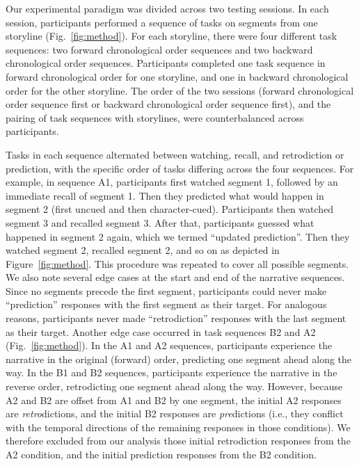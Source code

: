 \documentclass[10pt]{article}
\begin{document}
Our experimental paradigm was divided across two testing sessions. In each
session, participants performed a sequence of tasks on segments from one
storyline (Fig.~\ref{fig:method}). For each storyline, there were four
different task sequences: two forward chronological order sequences and two
backward chronological order sequences. Participants completed one task
sequence in forward chronological order for one storyline, and one in backward
chronological order for the other storyline. The order of the two sessions
(forward chronological order sequence first or backward chronological order
sequence first), and the pairing of task sequences with storylines, were
counterbalanced across participants.

Tasks in each sequence alternated between watching, recall, and retrodiction or
prediction, with the specific order of tasks differing across the four
sequences. For example, in sequence A1, participants first watched segment 1,
followed by an immediate recall of segment 1. Then they predicted what would
happen in segment 2 (first uncued and then character-cued). Participants then
watched segment 3 and recalled segment 3. After that, participants guessed what
happened in segment 2 again, which we termed ``updated prediction''. Then they
watched segment 2, recalled segment 2, and so on as depicted in
Figure~\ref{fig:method}. This procedure was repeated to cover all possible
segments. We also note several edge cases at the start and end of the narrative
sequences. Since no segments precede the first segment, participants could
never make ``prediction'' responses with the first segment as their target. For
analogous reasons, participants never made ``retrodiction'' responses with the
last segment as their target. Another edge case occurred in task sequences B2
and A2 (Fig.~\ref{fig:method}). In the A1 and A2 sequences, participants
experience the narrative in the original (forward) order, predicting one
segment ahead along the way. In the B1 and B2 sequences, participants
experience the narrative in the reverse order, retrodicting one segment ahead
along the way. However, because A2 and B2 are offset from A1 and B2 by one
segment, the initial A2 responses are \textit{retro}dictions, and the initial
B2 responses are \textit{pre}dictions (i.e., they conflict with the temporal
directions of the remaining responses in those conditions). We therefore
excluded from our analysis those initial retrodiction responses from the A2
condition, and the initial prediction responses from the B2 condition.
\end{document}

